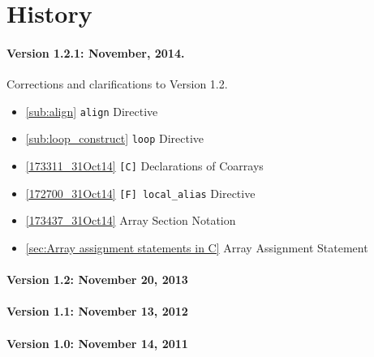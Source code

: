 \section*{History}

\paragraph*{Version 1.2.1: November, 2014.} Corrections and
clarifications to Version 1.2.

\begin{itemize}
  \item \ref{sub:align} {\tt align} Directive
  \item \ref{sub:loop_construct} {\tt loop} Directive
  \item \ref{173311_31Oct14} {\tt [C]} Declarations of Coarrays
  \item \ref{172700_31Oct14} {\tt [F] local\_alias} Directive
  \item \ref{173437_31Oct14} Array Section Notation
  \item \ref{sec:Array assignment statements in C} Array Assignment Statement
\end{itemize}

\paragraph*{Version 1.2: November 20, 2013}

\paragraph*{Version 1.1: November 13, 2012}

\paragraph*{Version 1.0: November 14, 2011}